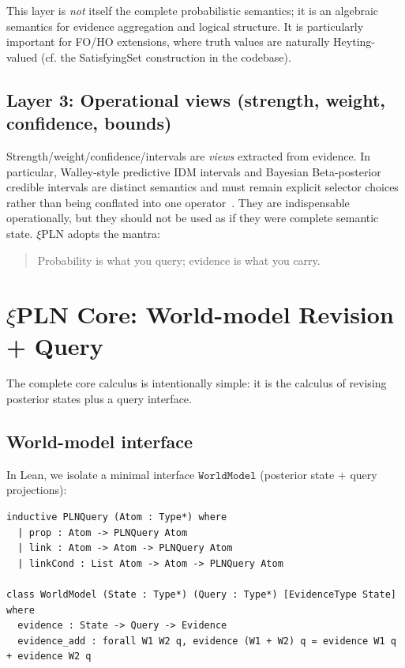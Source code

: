 \documentclass[]{article}
\newcommand{\xiPLN}{\texorpdfstring{$\xi$}{xi}\textup{PLN}}
\newcommand{\ty}[1]{\ensuremath{\mathtt{#1}}}
\newcommand{\WorldModel}{\ty{WorldModel}}
\begin{document}
This layer is \emph{not} itself the complete probabilistic semantics; it is an algebraic
semantics for evidence aggregation and logical structure.
It is particularly important for FO/HO extensions, where truth values are naturally
Heyting-valued (cf. the SatisfyingSet construction in the codebase).

\subsection{Layer 3: Operational views (strength, weight, confidence, bounds)}

Strength/weight/confidence/intervals are \emph{views} extracted from evidence.
In particular, Walley-style predictive IDM intervals and Bayesian Beta-posterior
credible intervals are distinct semantics and must remain explicit selector choices
rather than being conflated into one operator~\cite{Walley1991,Walley1996BagOfMarbles,BenavoliDeCampos2009MLEDominance}.
They are indispensable operationally, but they should not be used as if they were complete
semantic state.  \xiPLN{} adopts the mantra:

\begin{quote}
Probability is what you query; evidence is what you carry.
\end{quote}

\section{\xiPLN{} Core: World-model Revision + Query}

The complete core calculus is intentionally simple: it is the calculus of revising posterior
states plus a query interface.

\subsection{World-model interface}

In Lean, we isolate a minimal interface \WorldModel{} (posterior state + query projections):

\begin{lstlisting}
inductive PLNQuery (Atom : Type*) where
  | prop : Atom -> PLNQuery Atom
  | link : Atom -> Atom -> PLNQuery Atom
  | linkCond : List Atom -> Atom -> PLNQuery Atom

class WorldModel (State : Type*) (Query : Type*) [EvidenceType State] where
  evidence : State -> Query -> Evidence
  evidence_add : forall W1 W2 q, evidence (W1 + W2) q = evidence W1 q + evidence W2 q
\end{lstlisting}
\end{document}
